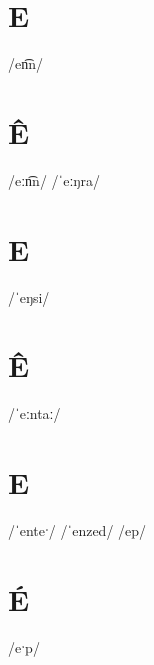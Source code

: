 \documentclass[10pt,a4paper,twoside]{book}
\begin{document}
\section*{E}

\begin{multicols}{3}
 {/en͡n/} {}
\end{multicols}

\section*{Ê}

\begin{multicols}{3}
 {/eːn͡n/} {}
 {/ˈeːŋra/} {}
\end{multicols}

\section*{E}

\begin{multicols}{3}
 {/ˈeŋsi/} {}
\end{multicols}

\section*{Ê}

\begin{multicols}{3}
 {/ˈeːntaː/} {}
\end{multicols}

\section*{E}

\begin{multicols}{3}
 {/ˈenteˑ/} {}
 {/ˈenzed/} {}
 {/ep/} {}
\end{multicols}

\section*{É}

\begin{multicols}{3}
 {/eˑp/} {}
\end{multicols}
\end{document}
